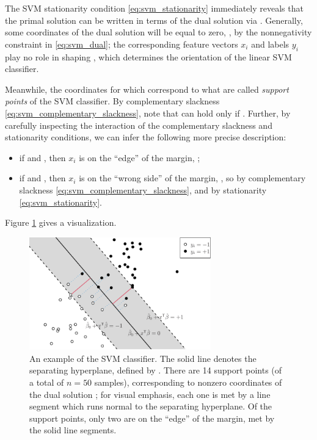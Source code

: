\begin{Example}
The SVM stationarity condition \eqref{eq:svm_stationarity}
immediately reveals that the primal solution \smash{$\hbeta$} can be written in
terms of the dual solution via . Generally, some coordinates of the dual solution will be equal to zero,
, by the nonnegativity constraint in \eqref{eq:svm_dual};
the corresponding feature vectors $x_i$ and labels $y_i$ play no role in shaping
\smash{$\hbeta$}, which determines the orientation of the linear SVM
classifier. 

\setlength{\parindent}{\normalparindent}
Meanwhile, the coordinates for which  correspond to
what are called \emph{support points} of the SVM classifier. By complementary
slackness \eqref{eq:svm_complementary_slackness}, note that  can hold only if . Further, by carefully inspecting the interaction of the
complementary slackness and stationarity conditions, we can infer the following 
more precise description: 
\begin{itemize}
\item if  and , then $x_i$ is on
  the ``edge'' of the margin, ;    
\item if  and , then $x_i$
  is on the ``wrong side'' of the margin, , so  by complementary slackness
  \eqref{eq:svm_complementary_slackness}, and  by   
  stationarity \eqref{eq:svm_stationarity}.
\end{itemize}
Figure \ref{fig:svm} gives a visualization.
\end{Example}

\begin{figure}[tb]
\centering
\includegraphics[width=0.7\textwidth]{fig/svm.pdf}
\caption{An example of the SVM classifier. The solid line denotes the
  separating hyperplane, defined by . There
  are 14 support points (of a total of $n = 50$ samples), corresponding to
  nonzero coordinates of the dual solution \smash{$\halpha$}; for visual 
  emphasis, each one is met by a line segment which runs normal to the
  separating hyperplane. Of the support points, only two are on the ``edge'' of
  the margin, met by the solid line segments.} 
\label{fig:svm}
\end{figure}

